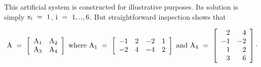 This artificial system is constructed for illustrative purposes. 
Its solution is simply ${\rm x_i~=~1}$, ${\rm i~=~1,..,6}$. 
But straightforward inspection shows that

 \[ {\rm A}~=~\left[ \begin{array}{cc}
                          {\rm A}_1 & {\rm A}_2 \\
                          {\rm A}_3 & {\rm A}_4 \end{array}\right]~
            {\rm where}~{\rm A}_1~=~\left[ \begin{array}{cccc}
                                  -1 & 2 & -2 & 1\\ 
                                  -2 & 4 & -4 & 2  \end{array}\right]~
            {\rm and}~ {\rm A}_4~=~\left[ \begin{array}{rr}
                          2 & 4 \\
                         -1 & -2 \\
                          1 & 2 \\
                          3 & 6 \end{array} \right] \cdot \]

